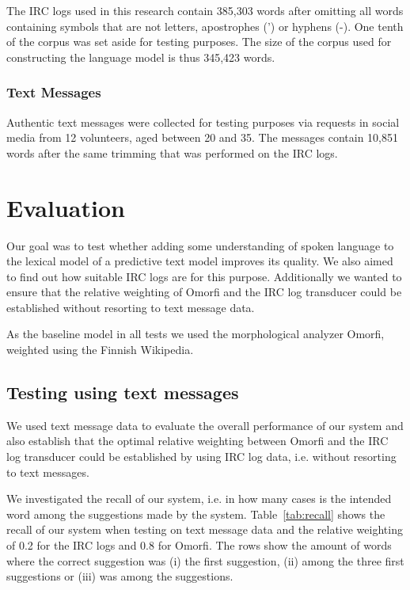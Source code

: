 \documentclass[a4paper,conference]{IEEEtran}
\begin{document}
The IRC logs used in this research contain 385,303 words after omitting
all words containing symbols that are not letters, apostrophes (')
or hyphens (-). One tenth of the corpus was set aside for testing
purposes. The size of the corpus used for constructing the language
model is thus 345,423 words.


\subsubsection{Text Messages}

Authentic text messages were collected for testing purposes via requests in social media from 12 volunteers, aged between 20 and 35. The messages contain 10,851 words after the same trimming that was performed on the IRC logs.

\section{Evaluation}
\label{sec:evaluation}

Our goal was to test whether adding some understanding of spoken
language to the lexical model of a predictive text model improves its
quality. We also aimed to find out how suitable IRC logs are for this
purpose. Additionally we wanted to ensure that the relative weighting
of Omorfi and the IRC log transducer could be established without
resorting to text message data. 

As the baseline model in all tests we used the morphological analyzer
Omorfi, weighted using the Finnish Wikipedia.


\subsection{Testing using text messages}
 
We used text message data to evaluate the overall performance of our
system and also establish that the optimal relative weighting between
Omorfi and the IRC log transducer could be established by using IRC
log data, i.e. without resorting to text messages.

We investigated the recall of our system, i.e. in how many cases is the intended word among the suggestions made by the system. Table~\ref{tab:recall} shows the recall of our system when testing on text message data and the relative weighting of 0.2 for the IRC logs
and 0.8 for Omorfi. The rows show the amount of words where the
correct suggestion was (i) the first suggestion, (ii) among the three
first suggestions or (iii) was among the suggestions.
\end{document}
